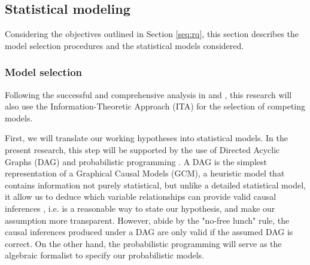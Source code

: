 \begin{comment}
	\textbf{for the experimenter:} Based on \citet{Faes_et_al_2021} we depict the procedure for the experimenter:
	\begin{enumerate}
		\item 1. matching procedure 
		\item selection of suitable stimuli
		\item determine the number of stimuli per judge 
		\item 
	\end{enumerate}
	
	about matching procedure \citep{Faes_et_al_2021}:
	NH children were matched on gender, age and regional background, to the other two groups.Based on the previous NH kids were not representative of the NH population. 
	Question: How they were matched?, Propensity Score Matching or manual work?. 
	Age in NH at least has to be matched with "hearing age" in other groups, i.e. the length of use of the hearing device. However is still not completely appropriate. "lexical age", i.e. vocabulary size, is another matching measure (see p. 14 in \citep{Faes_et_al_2021} for more) 
	
\end{comment}
%
%
\subsection{Statistical modeling} \label{s_sect:models}
%
Considering the objectives outlined in Section \ref{seq:rq}, this section describes the model selection procedures and the statistical models considered.
%
\subsubsection{Model selection}
%
Following the successful and comprehensive analysis in \citet{vanDaal_2020} and \citet{Lesterhuis_2018}, this research will also use the Information-Theoretic Approach (ITA) \citep{Anderson_2008, Chamberlain_1965} for the selection of competing models. 

First, we will translate our working hypotheses into statistical models. In the present research, this step will be supported by the use of Directed Acyclic Graphs (DAG) and probabilistic programming \citep{Jaynes_2003}. A DAG is the simplest representation of a Graphical Causal Models (GCM), a heuristic model that contains information not purely statistical, but unlike a detailed statistical model, it allow us to deduce which variable relationships can provide valid causal inferences \citep{Hernan_et_al_2020, McElreath_2020}, i.e. is a reasonable way to state our hypothesis, and make our assumption more transparent. However, abide by the "no-free lunch" rule, the causal inferences produced under a DAG are only valid if the assumed DAG is correct. On the other hand, the probabilistic programming will serve as the algebraic formalist to specify our probabilistic models.

